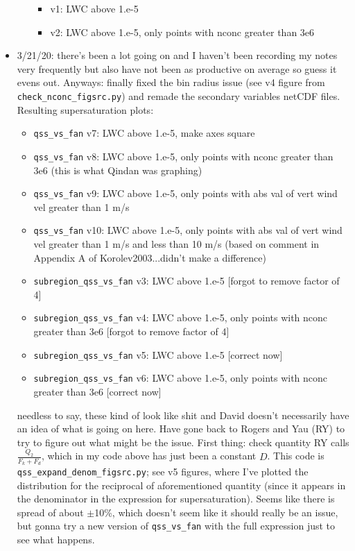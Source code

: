 \documentclass{article}
\begin{document}
\begin{itemize}
\begin{itemize}
		\begin{itemize}
			\item v1: LWC above 1.e-5
			\item v2: LWC above 1.e-5, only points with nconc greater than 3e6
		\end{itemize}
	\end{itemize}
	\item 3/21/20: there's been a lot going on and I haven't been recording my notes very frequently but also have not been as productive on average so guess it evens out. Anyways: finally fixed the bin radius issue (see v4 figure from \texttt{check\_nconc\_figsrc.py}) and remade the secondary variables netCDF files. Resulting supersaturation plots:
	\begin{itemize}
			\item \texttt{qss\_vs\_fan} v7: LWC above 1.e-5, make axes square
			\item \texttt{qss\_vs\_fan} v8: LWC above 1.e-5, only points with nconc greater than 3e6 (this is what Qindan was graphing)
			\item \texttt{qss\_vs\_fan} v9: LWC above 1.e-5, only points with abs val of vert wind vel greater than 1 m/s
			\item \texttt{qss\_vs\_fan} v10: LWC above 1.e-5, only points with abs val of vert wind vel greater than 1 m/s and less than 10 m/s (based on comment in Appendix A of Korolev2003...didn't make a difference)
			\item \texttt{subregion\_qss\_vs\_fan} v3: LWC above 1.e-5 [forgot to remove factor of 4]
			\item \texttt{subregion\_qss\_vs\_fan} v4: LWC above 1.e-5, only points with nconc greater than 3e6 [forgot to remove factor of 4]
			\item \texttt{subregion\_qss\_vs\_fan} v5: LWC above 1.e-5 [correct now]
			\item \texttt{subregion\_qss\_vs\_fan} v6: LWC above 1.e-5, only points with nconc greater than 3e6 [correct now] 
	\end{itemize}
	needless to say, these kind of look like shit and David doesn't necessarily have an idea of what is going on here. Have gone back to Rogers and Yau (RY) to try to figure out what might be the issue. First thing: check quantity RY calls $\frac{Q_2}{F_k + F_d}$, which in my code above has just been a constant $D$. This code is \texttt{qss\_expand\_denom\_figsrc.py}; see v5 figures, where I've plotted the distribution for the reciprocal of aforementioned quantity (since it appears in the denominator in the expression for supersaturation). Seems like there is spread of about $\pm$10\%, which doesn't seem like it should really be an issue, but gonna try a new version of \texttt{qss\_vs\_fan} with the full expression just to see what happens. \\

\end{itemize}
\end{document}

